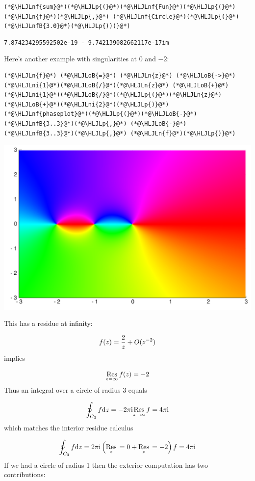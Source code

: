 \documentclass[12pt,a4paper]{article}
\newcommand{\HLJLn}[1]{#1}
\newcommand{\HLJLnf}[1]{\textcolor[RGB]{66,102,213}{#1}}
\newcommand{\HLJLnfB}[1]{\textcolor[RGB]{59,151,46}{#1}}
\newcommand{\HLJLni}[1]{\textcolor[RGB]{59,151,46}{#1}}
\newcommand{\HLJLoB}[1]{\textcolor[RGB]{102,102,102}{\textbf{#1}}}
\newcommand{\HLJLp}[1]{#1}
\def\D{ {\rm d} }
\def\I{ {\rm i} }
\def\Res_#1{\underset{#1}{\rm Res}\,}
\def\pr(#1){\left({#1}\right)}
\begin{document}
\begin{lstlisting}
(*@\HLJLnf{sum}@*)(*@\HLJLp{(}@*)(*@\HLJLnf{Fun}@*)(*@\HLJLp{(}@*)(*@\HLJLn{f}@*)(*@\HLJLp{,}@*) (*@\HLJLnf{Circle}@*)(*@\HLJLp{(}@*)(*@\HLJLnfB{3.0}@*)(*@\HLJLp{)))}@*)
\end{lstlisting}

\begin{lstlisting}
7.874234295592502e-19 - 9.742139082662117e-17im
\end{lstlisting}


Here's another example with singularities at $0$ and $-2$:


\begin{lstlisting}
(*@\HLJLn{f}@*) (*@\HLJLoB{=}@*) (*@\HLJLn{z}@*) (*@\HLJLoB{->}@*) (*@\HLJLni{1}@*)(*@\HLJLoB{/}@*)(*@\HLJLn{z}@*) (*@\HLJLoB{+}@*) (*@\HLJLni{1}@*)(*@\HLJLoB{/}@*)(*@\HLJLp{(}@*)(*@\HLJLn{z}@*)(*@\HLJLoB{+}@*)(*@\HLJLni{2}@*)(*@\HLJLp{)}@*)
(*@\HLJLnf{phaseplot}@*)(*@\HLJLp{(}@*)(*@\HLJLoB{-}@*)(*@\HLJLnfB{3..3}@*)(*@\HLJLp{,}@*) (*@\HLJLoB{-}@*)(*@\HLJLnfB{3..3}@*)(*@\HLJLp{,}@*) (*@\HLJLn{f}@*)(*@\HLJLp{)}@*)
\end{lstlisting}

\includegraphics[width=\linewidth]{figures/Lecture4_6_1.pdf}

This has a residue at infinity:

\[
f(z) = {2 \over z} + O(z^{-2})
\]
implies

\[
\Res_{z = \infty} f(z) = -2
\]
Thus an integral over a circle of radius 3 equals 

\[
\oint_{C_3} f \D z = -2 \pi \I \Res_{z = \infty} f = 4\pi \I 
\]
which matches the interior residue calculus

\[
\oint_{C_3} f \D z =  2 \pi \I \pr(\Res_{z = 0} + \Res_{z = -2}) f = 4 \pi \I
\]
If we had a circle of radius 1 then the exterior computation has two contributions:
\end{document}

